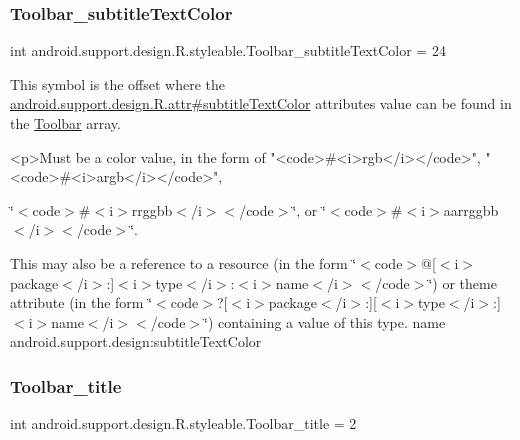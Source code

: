 \subsubsection{\texorpdfstring{Toolbar\+\_\+subtitle\+Text\+Color}{Toolbar\_subtitleTextColor}}
{\footnotesize\ttfamily int android.\+support.\+design.\+R.\+styleable.\+Toolbar\+\_\+subtitle\+Text\+Color = 24\hspace{0.3cm}{\ttfamily [static]}}

This symbol is the offset where the \hyperlink{classandroid_1_1support_1_1design_1_1R_1_1attr_acdc80a288896de3528fa898e7c23a687}{android.\+support.\+design.\+R.\+attr\#subtitle\+Text\+Color} attribute\textquotesingle{}s value can be found in the \hyperlink{classandroid_1_1support_1_1design_1_1R_1_1styleable_a7783ebe780dbe2a845802a40519a46e9}{Toolbar} array.

\begin{DoxyVerb}      <p>Must be a color value, in the form of "<code>#<i>rgb</i></code>", "<code>#<i>argb</i></code>",
\end{DoxyVerb}
 \char`\"{}$<$code$>$\#$<$i$>$rrggbb$<$/i$>$$<$/code$>$\char`\"{}, or \char`\"{}$<$code$>$\#$<$i$>$aarrggbb$<$/i$>$$<$/code$>$\char`\"{}. 

This may also be a reference to a resource (in the form \char`\"{}$<$code$>$@\mbox{[}$<$i$>$package$<$/i$>$\+:\mbox{]}$<$i$>$type$<$/i$>$\+:$<$i$>$name$<$/i$>$$<$/code$>$\char`\"{}) or theme attribute (in the form \char`\"{}$<$code$>$?\mbox{[}$<$i$>$package$<$/i$>$\+:\mbox{]}\mbox{[}$<$i$>$type$<$/i$>$\+:\mbox{]}$<$i$>$name$<$/i$>$$<$/code$>$\char`\"{}) containing a value of this type.  name android.\+support.\+design\+:subtitle\+Text\+Color \mbox{\label{classandroid_1_1support_1_1design_1_1R_1_1styleable_abec4f071992436f684430ab2be771dcb}} 
\subsubsection{\texorpdfstring{Toolbar\+\_\+title}{Toolbar\_title}}
{\footnotesize\ttfamily int android.\+support.\+design.\+R.\+styleable.\+Toolbar\+\_\+title = 2\hspace{0.3cm}{\ttfamily [static]}}


